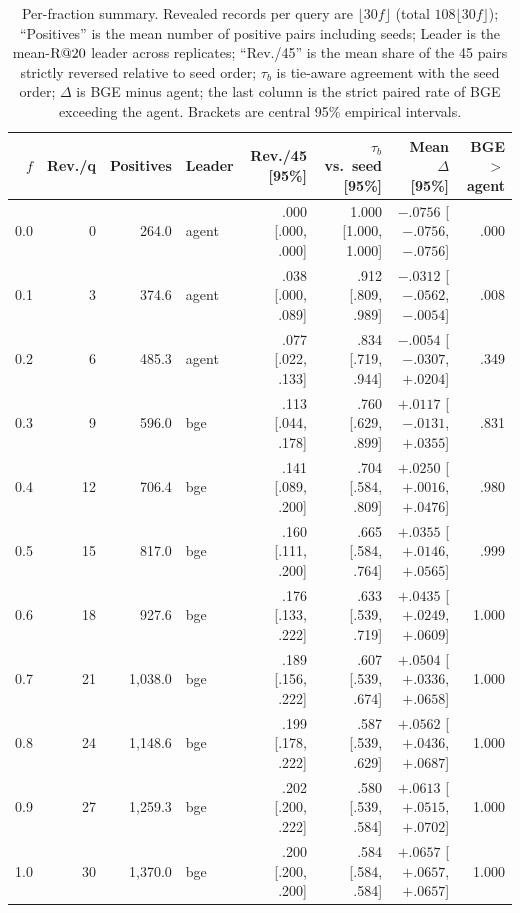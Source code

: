 \begin{table}[h]
\centering
\small
\caption{Per-fraction summary. Revealed records per query are $\lfloor30f\rfloor$ (total $108\lfloor30f\rfloor$); ``Positives'' is the mean number of positive pairs including seeds; Leader is the mean-$\mathrm{R}@20$ leader across replicates; ``Rev./45'' is the mean share of the 45 pairs strictly reversed relative to seed order; $\tau_b$ is tie-aware agreement with the seed order; $\Delta$ is BGE minus agent; the last column is the strict paired rate of BGE exceeding the agent. Brackets are central 95\% empirical intervals.}
\label{tab:gridsummary}
\scriptsize
\setlength{\tabcolsep}{2.6pt}
\begin{tabular}{@{}rrrlrrrr@{}}
\toprule
$f$ & Rev./q & Positives & Leader & Rev./45 [95\%] & $\tau_b$ vs.\ seed [95\%] & Mean $\Delta$ [95\%] & BGE $>$ agent \\
\midrule
0.0 & 0 & 264.0 & agent & .000 [.000, .000] & 1.000 [1.000, 1.000] & $-.0756$ [$-.0756$, $-.0756$] & .000 \\
0.1 & 3 & 374.6 & agent & .038 [.000, .089] & .912 [.809, .989] & $-.0312$ [$-.0562$, $-.0054$] & .008 \\
0.2 & 6 & 485.3 & agent & .077 [.022, .133] & .834 [.719, .944] & $-.0054$ [$-.0307$, $+.0204$] & .349 \\
0.3 & 9 & 596.0 & bge & .113 [.044, .178] & .760 [.629, .899] & $+.0117$ [$-.0131$, $+.0355$] & .831 \\
0.4 & 12 & 706.4 & bge & .141 [.089, .200] & .704 [.584, .809] & $+.0250$ [$+.0016$, $+.0476$] & .980 \\
0.5 & 15 & 817.0 & bge & .160 [.111, .200] & .665 [.584, .764] & $+.0355$ [$+.0146$, $+.0565$] & .999 \\
0.6 & 18 & 927.6 & bge & .176 [.133, .222] & .633 [.539, .719] & $+.0435$ [$+.0249$, $+.0609$] & 1.000 \\
0.7 & 21 & 1,038.0 & bge & .189 [.156, .222] & .607 [.539, .674] & $+.0504$ [$+.0336$, $+.0658$] & 1.000 \\
0.8 & 24 & 1,148.6 & bge & .199 [.178, .222] & .587 [.539, .629] & $+.0562$ [$+.0436$, $+.0687$] & 1.000 \\
0.9 & 27 & 1,259.3 & bge & .202 [.200, .222] & .580 [.539, .584] & $+.0613$ [$+.0515$, $+.0702$] & 1.000 \\
1.0 & 30 & 1,370.0 & bge & .200 [.200, .200] & .584 [.584, .584] & $+.0657$ [$+.0657$, $+.0657$] & 1.000 \\
\bottomrule
\end{tabular}
\end{table}

